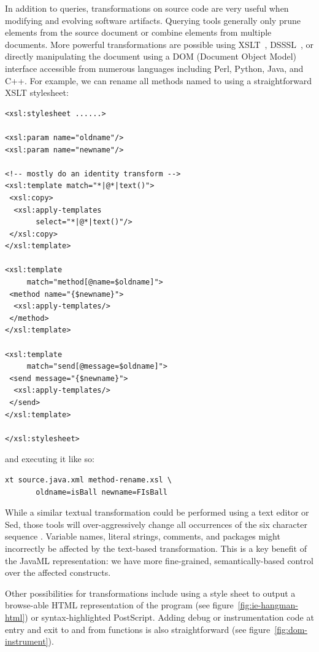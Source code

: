 \documentclass{article}
\begin{document}
\begin{multicols}{2}
In addition to queries, transformations on source
code are very useful when modifying and
evolving software artifacts.  Querying tools generally only prune
elements from the source document or combine elements from multiple
documents.  More powerful transformations are possible using
XSLT~\cite{XSLT}, DSSSL~\cite{DSSSL}, or directly manipulating the
document using a DOM (Document Object Model)~\cite{DOM} interface
accessible from numerous languages including Perl, Python, Java, and
C++.  For example, we can rename all methods named  to
 using a straightforward XSLT stylesheet:

{ \small
\begin{verbatim}
<xsl:stylesheet ......>

<xsl:param name="oldname"/>
<xsl:param name="newname"/>

<!-- mostly do an identity transform -->
<xsl:template match="*|@*|text()">
 <xsl:copy>
  <xsl:apply-templates 
       select="*|@*|text()"/>
 </xsl:copy>
</xsl:template>

<xsl:template
     match="method[@name=$oldname]">
 <method name="{$newname}">
  <xsl:apply-templates/>
 </method>
</xsl:template>

<xsl:template
     match="send[@message=$oldname]">
 <send message="{$newname}">
  <xsl:apply-templates/>
 </send>
</xsl:template>

</xsl:stylesheet>
\end{verbatim}
}

\noindent and executing it like so:

\begin{verbatim}
xt source.java.xml method-rename.xsl \
       oldname=isBall newname=FIsBall
\end{verbatim}

While a similar textual transformation could be performed using a text
editor or Sed, those tools will over-aggressively change all occurrences
of the six character sequence \smtexttt{isBall}. Variable names, literal
strings, comments, and packages might incorrectly be affected by the
text-based transformation. This is a key benefit of the JavaML
representation: we have more fine-grained, semantically-based control
over the affected constructs.

Other possibilities for transformations include using a style sheet to output a
browse-able HTML representation of the program (see figure~\ref{fig:ie-hangman-html})
or syntax-highlighted PostScript.  Adding debug or instrumentation code at entry and
exit to and from functions is also straightforward (see figure~\ref{fig:dom-instrument}).


\end{multicols}
\end{document}
